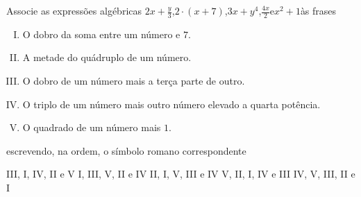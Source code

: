 Associe as expressões algébricas $2x+\frac{y}{3}$,\quad $2\cdot(x+7)$,\quad $3x+y^4$,\quad $\frac{4x}{2}$\quad e\quad $x^2+1$\quad às frases
\begin{enumerate}[I.]
\item O dobro da soma entre um número e $7$.
\item A metade do quádruplo de um número.
\item O dobro de um número mais a terça parte de outro.
\item O triplo de um número mais outro número elevado a quarta potência.
\item O quadrado de um número mais $1$.
\end{enumerate}
escrevendo, na ordem, o símbolo romano correspondente

III, I, IV, II e V
I, III, V, II e IV
II, I, V, III e IV
V, II, I, IV e III
IV, V, III, II e I



